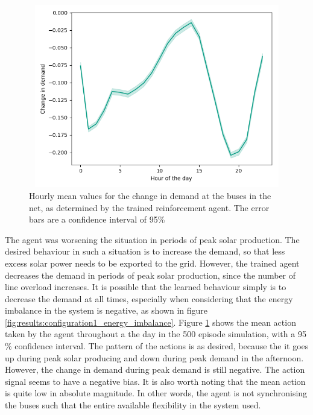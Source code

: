 \documentclass[class=book, crop=false]{standalone}
\begin{document}
\begin{figure}[h]
    \center
\includegraphics[height=8cm, width=12cm]{figures/config1_action_hour.png}
    \caption[size = 9]{Hourly mean values for the change in demand at the buses in the net, as determined by the trained reinforcement agent. The error bars are a confidence interval of 95\%}
    \label{fig:discussion:config1_action_hour}
\end{figure}

The agent was worsening the situation in periods of peak solar production. The desired behaviour in such a situation is to increase the demand, so that less excess solar power needs to be exported to the grid. However, the trained agent decreases the demand in periods of peak solar production, since the number of line overload increases. It is possible that the learned behaviour simply is to decrease the demand at all times, especially when considering that the energy imbalance in the system is negative, as shown in figure \ref{fig:results:configuration1_energy_imbalance}. Figure \ref{fig:discussion:config1_action_hour} shows the mean action taken by the agent throughout a the day in the 500 episode simulation, with a 95 \% confidence interval. The pattern of the actions is as desired, because the it goes up during peak solar producing and down during peak demand in the afternoon. However, the change in demand during peak demand is still negative. The action signal seems to have a negative bias. It is also worth noting that the mean action is quite low in absolute magnitude. In other words, the agent is not synchronising the buses such that the entire available flexibility in the system used.
\end{document}
